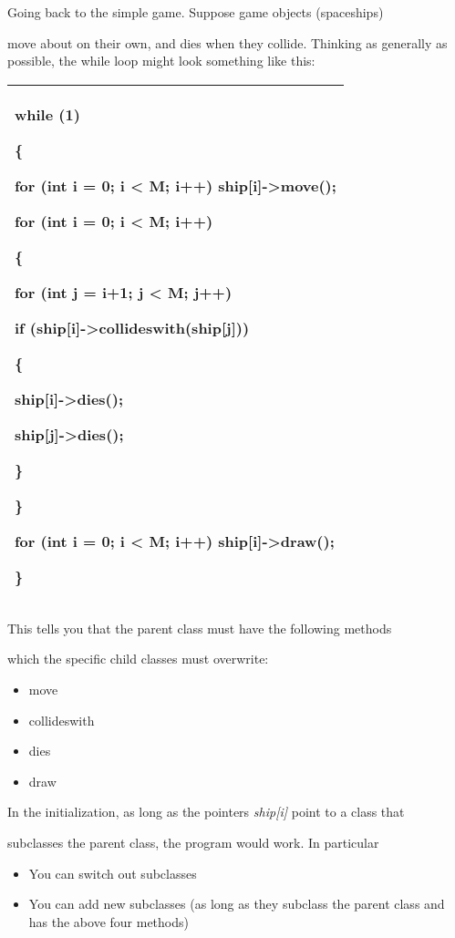 \documentclass[
]{article}
\providecommand{\tightlist}{%
  \setlength{\itemsep}{0pt}\setlength{\parskip}{0pt}}
\begin{document}
Going back to the simple game. Suppose game objects (spaceships)

move about on their own, and dies when they collide. Thinking as
generally as possible, the while loop might look something like this:

\begin{longtable}[]{@{}l@{}}
\toprule
\endhead
\begin{minipage}[t]{0.97\columnwidth}\raggedright
while (1)

\{

for (int i = 0; i \textless{} M; i++) ship{[}i{]}-\textgreater move();

for (int i = 0; i \textless{} M; i++)

\{

for (int j = i+1; j \textless{} M; j++)

if (ship{[}i{]}-\textgreater collideswith(ship{[}j{]}))

\{

ship{[}i{]}-\textgreater dies();

ship{[}j{]}-\textgreater dies();

\}

\}

for (int i = 0; i \textless{} M; i++) ship{[}i{]}-\textgreater draw();

\}\strut
\end{minipage}\tabularnewline
\bottomrule
\end{longtable}

This tells you that the parent class must have the following methods

which the specific child classes must overwrite:

\begin{itemize}
\tightlist
\item
  move
\item
  collideswith
\item
  dies
\item
  draw
\end{itemize}

In the initialization, as long as the pointers \emph{ship{[}i{]}} point
to a class that

subclasses the parent class, the program would work. In particular

\begin{itemize}
\tightlist
\item
  You can switch out subclasses
\item
  You can add new subclasses (as long as they subclass the parent class
  and has the above four methods)
\end{itemize}
\end{document}
